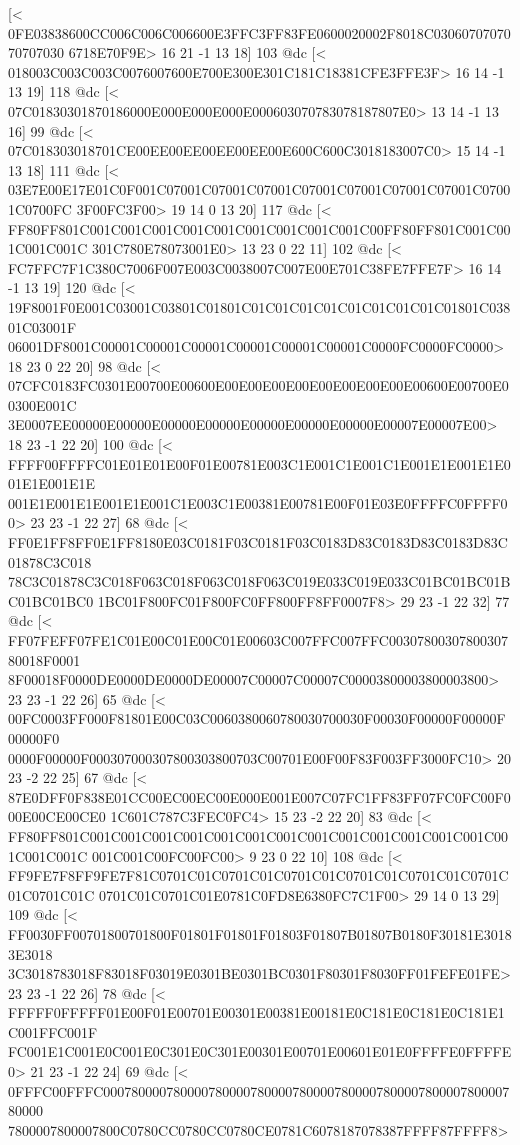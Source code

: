 [<
0FE03838600CC006C006C006600E3FFC3FF83FE0600020002F8018C0306070707070707030
6718E70F9E>
	 16 21 -1 13 18] 103 @dc
[<
018003C003C003C0076007600E700E300E301C181C18381CFE3FFE3F>
	 16 14 -1 13 19] 118 @dc
[<
07C01830301870186000E000E000E000E000603070783078187807E0>
	 13 14 -1 13 16] 99 @dc
[<
07C018303018701CE00EE00EE00EE00EE00E600C600C3018183007C0>
	 15 14 -1 13 18] 111 @dc
[<
03E7E00E17E01C0F001C07001C07001C07001C07001C07001C07001C07001C07001C0700FC
3F00FC3F00>
	 19 14 0 13 20] 117 @dc
[<
FF80FF801C001C001C001C001C001C001C001C001C001C00FF80FF801C001C001C001C001C
301C780E78073001E0>
	 13 23 0 22 11] 102 @dc
[<
FC7FFC7F1C380C7006F007E003C0038007C007E00E701C38FE7FFE7F>
	 16 14 -1 13 19] 120 @dc
[<
19F8001F0E001C03001C03801C01801C01C01C01C01C01C01C01C01C01801C03801C03001F
06001DF8001C00001C00001C00001C00001C00001C00001C0000FC0000FC0000>
	 18 23 0 22 20] 98 @dc
[<
07CFC0183FC0301E00700E00600E00E00E00E00E00E00E00E00E00600E00700E00300E001C
3E0007EE00000E00000E00000E00000E00000E00000E00000E00007E00007E00>
	 18 23 -1 22 20] 100 @dc
[<
FFFF00FFFFC01E01E01E00F01E00781E003C1E001C1E001C1E001E1E001E1E001E1E001E1E
001E1E001E1E001E1E001C1E003C1E00381E00781E00F01E03E0FFFFC0FFFF00>
	 23 23 -1 22 27] 68 @dc
[<
FF0E1FF8FF0E1FF8180E03C0181F03C0181F03C0183D83C0183D83C0183D83C01878C3C018
78C3C01878C3C018F063C018F063C018F063C019E033C019E033C01BC01BC01BC01BC01BC0
1BC01F800FC01F800FC0FF800FF8FF0007F8>
	 29 23 -1 22 32] 77 @dc
[<
FF07FEFF07FE1C01E00C01E00C01E00603C007FFC007FFC0030780030780030780018F0001
8F00018F0000DE0000DE0000DE00007C00007C00007C00003800003800003800>
	 23 23 -1 22 26] 65 @dc
[<
00FC0003FF000F81801E00C03C0060380060780030700030F00030F00000F00000F00000F0
0000F00000F000307000307800303800703C00701E00F00F83F003FF3000FC10>
	 20 23 -2 22 25] 67 @dc
[<
87E0DFF0F838E01CC00EC00EC00E000E001E007C07FC1FF83FF07FC0FC00F000E00CE00CE0
1C601C787C3FEC0FC4>
	 15 23 -2 22 20] 83 @dc
[<
FF80FF801C001C001C001C001C001C001C001C001C001C001C001C001C001C001C001C001C
001C001C00FC00FC00>
	 9 23 0 22 10] 108 @dc
[<
FF9FE7F8FF9FE7F81C0701C01C0701C01C0701C01C0701C01C0701C01C0701C01C0701C01C
0701C01C0701C01E0781C0FD8E6380FC7C1F00>
	 29 14 0 13 29] 109 @dc
[<
FF0030FF00701800701800F01801F01801F01803F01807B01807B0180F30181E30183E3018
3C3018783018F83018F03019E0301BE0301BC0301F80301F8030FF01FEFE01FE>
	 23 23 -1 22 26] 78 @dc
[<
FFFFF0FFFFF01E00F01E00701E00301E00381E00181E0C181E0C181E0C181E1C001FFC001F
FC001E1C001E0C001E0C301E0C301E00301E00701E00601E01E0FFFFE0FFFFE0>
	 21 23 -1 22 24] 69 @dc
[<
0FFFC00FFFC000780000780000780000780000780000780000780000780000780000780000
7800007800007800C0780CC0780CC0780CE0781C6078187078387FFFF87FFFF8>
